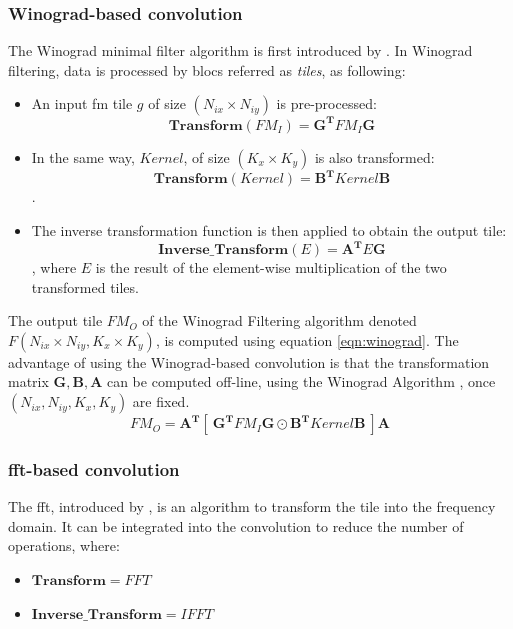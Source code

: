 \subsubsection{Winograd-based convolution}
%
The Winograd minimal filter algorithm is first introduced by \cite{winograd_arithmetic_1980}. In Winograd filtering, data is processed by blocs referred as \textit{tiles}, as following:
\begin{itemize}
    \item An input \acrshort{fm} tile $g$ of size $(N_{ix} \times N_{iy})$ is pre-processed: $$\boldsymbol{Transform}(FM_I) = \boldsymbol{G^{T}} FM_I \boldsymbol{G} $$
    \item In the same way, $Kernel$, of size $(K_x \times K_y)$ is also transformed: $$\boldsymbol{Transform}(Kernel) = \boldsymbol{B^{T}} Kernel \boldsymbol{B}$$.
    \item The inverse transformation function is then applied to obtain the output tile: $$\boldsymbol{Inverse\_Transform}(E) = \boldsymbol{A^{T}} E \boldsymbol{G}$$, where $E$ is the result of the element-wise multiplication of the two transformed tiles.
\end{itemize}
The output tile $FM_O$ of the Winograd Filtering algorithm denoted $F(N_{ix} \times N_{iy}, K_x \times K_y)$, is computed using equation \ref{eqn:winograd}. The advantage of using the Winograd-based convolution is that the transformation matrix $\boldsymbol{G}, \boldsymbol{B}, \boldsymbol{A}$ can be computed off-line, using the Winograd Algorithm \cite{winograd_arithmetic_1980}, once $(N_{ix}, N_{iy}, K_x, K_y)$ are fixed.
\begin{equation}
\label{eqn:winograd}
FM_O = \boldsymbol{A^{T}} [ \ \boldsymbol{G^{T}} FM_I \boldsymbol{G} \odot \boldsymbol{B^{T}} Kernel \boldsymbol{B} \ ] \boldsymbol{A}
\end{equation}
%
\subsubsection{\acrshort{fft}-based convolution}
%
The \acrshort{fft}, introduced by \textcite{cooley_algorithm_1965}, is an algorithm to transform the tile into the frequency domain. It can be integrated into the convolution to reduce the number of operations, where:
\begin{itemize}
    \item $\boldsymbol{Transform} = FFT$
    \item $\boldsymbol{Inverse\_Transform} = IFFT$
\end{itemize}
%
